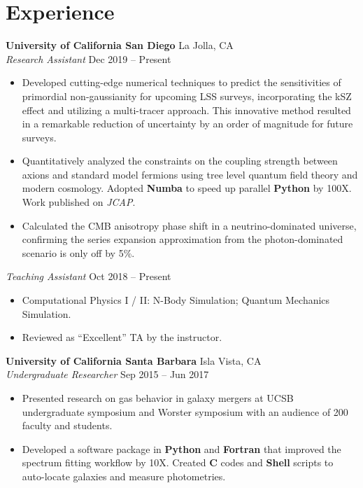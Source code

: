 \documentclass[letterpaper,12pt]{article}
\newenvironment{zitemize}{
\begin{itemize} \vspace{-.9em}\itemsep 0pt \parskip 0pt}
{\end{itemize}\vspace{-.5em}}
\newcommand{\proglang}[1]{\textbf{#1}}
\begin{document}
\section{Experience}
\textbf{University of California San Diego} \hfill La Jolla, CA \\
\textit{Research Assistant} \hfill Dec 2019 -- Present \\
\begin{zitemize}
    \item Developed cutting-edge numerical techniques to predict the sensitivities of primordial non-gaussianity for upcoming LSS surveys, incorporating the kSZ effect and utilizing a multi-tracer approach. This innovative method resulted in a remarkable reduction of uncertainty by an order of magnitude for future surveys.
    \item Quantitatively analyzed the constraints on the coupling strength between axions and standard model fermions using tree level quantum field theory and modern cosmology. Adopted \proglang{Numba} to speed up parallel \proglang{Python} by 100X. Work published on \textit{JCAP}.
    \item Calculated the CMB anisotropy phase shift in a neutrino-dominated universe, confirming the series expansion approximation from the photon-dominated scenario is only off by 5\%.
\end{zitemize}
\vspace{-0.5em}
\textit{Teaching Assistant} \hfill Oct 2018 -- Present \\
\begin{zitemize}
    \item Computational Physics I / II: N-Body Simulation; Quantum Mechanics Simulation. \\
    \item Reviewed as ``Excellent'' TA by the instructor.
\end{zitemize}

\textbf{University of California Santa Barbara} \hfill Isla Vista, CA \\
\textit{Undergraduate Researcher} \hfill Sep 2015 -- Jun 2017 \\
\begin{zitemize}
    \item Presented research on gas behavior in galaxy mergers at UCSB undergraduate symposium and Worster symposium with an audience of 200 faculty and students.
    \item Developed a software package in \proglang{Python} and \proglang{Fortran} that improved the spectrum fitting workflow by 10X. Created \proglang{C} codes and \proglang{Shell} scripts to auto-locate galaxies and measure photometries.
\end{zitemize}
\end{document}
